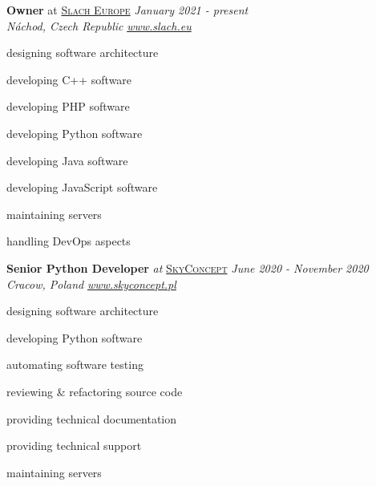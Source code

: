 \documentclass[10pt]{article}
\newenvironment{innerlist}[1][\enskip\textbullet]%
        {\begin{compactitem}[#1]}{\end{compactitem}}
\begin{document}
\textbf{Owner} at \href{http://www.slach.eu/}{\textsc{Slach Europe}} \hfill \textit{January 2021 - present} \\
\textit{Náchod, Czech Republic} 
\hfill \href{http://www.slach.eu/}{\textit{www.slach.eu}} 
\vspace{0.1in}
\begin{innerlist}
\item designing software architecture
\item developing C++ software
\item developing PHP software
\item developing Python software
\item developing Java software
\item developing JavaScript software
\item maintaining servers
\item handling DevOps aspects
\end{innerlist}

\vspace{0.30in}

\textbf{Senior Python Developer} \textit{at} \href{https://www.skyconcept.pl}{\textsc{SkyConcept}} \hfill \textit{June 2020 - November 2020} \\
\textit{Cracow, Poland} 
\hfill \href{https://www.skyconcept.pl}{\textit{www.skyconcept.pl}}
\vspace{0.1in}
\begin{innerlist}
\item designing software architecture
\item developing Python software
\item automating software testing
\item reviewing & refactoring source code
\item providing technical documentation
\item providing technical support
\item maintaining servers
\end{innerlist}

\vspace{0.30in}


\vspace{0.30in}
\end{document}

